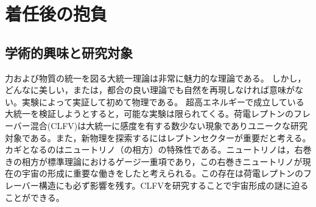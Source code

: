 
\section{着任後の抱負}

\noindent
\vspace{-2zw}
\subsection{学術的興味と研究対象}

%

力および物質の統一を図る大統一理論は非常に魅力的な理論である。%
しかし，どんなに美しい，または，都合の良い理論でも自然を再現しなければ意味がない。実験によって実証して初めて物理である。
超高エネルギーで成立している大統一を検証しようとすると，可能な実験は限られてくる。荷電レプトンのフレーバー混合(CLFV)は大統一に感度を有する数少ない現象でありユニークな研究対象である。また，新物理を探索するにはレプトンセクターが重要だと考える。カギとなるのはニュートリノ（の相方）の特殊性である。ニュートリノは，右巻きの相方が標準理論におけるゲージ一重項であり，この右巻きニュートリノが現在の宇宙の形成に重要な働きをしたと考えられる。この存在は荷電レプトンのフレーバー構造にも必ず影響を残す。CLFVを研究することで宇宙形成の謎に迫ることができる。

